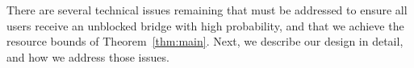 \documentclass[letterpaper,twocolumn,10pt]{article}
\begin{document}
There are several technical issues remaining that must be addressed to ensure all users receive an unblocked bridge with high probability, and that we achieve the resource bounds of Theorem~\ref{thm:main}.  Next, we describe our design in detail, and how we address those issues. 





\end{document}
